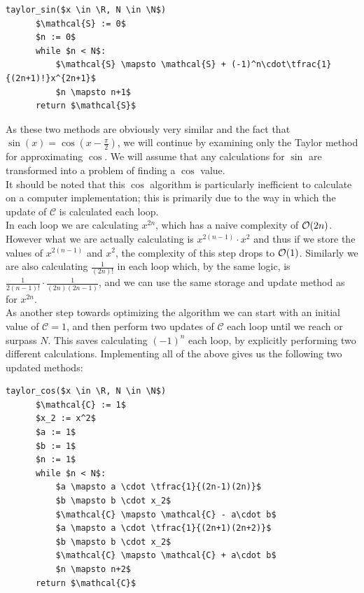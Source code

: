 {\begin{lstlisting}[caption={Taylor computation of \(\cos\) and \(\sin\)},label={PCD_"Taylor Cos/Sin"}]
  taylor_sin($x \in \R, N \in \N$)
      $\mathcal{S} := 0$
      $n := 0$
      while $n < N$:
          $\mathcal{S} \mapsto \mathcal{S} + (-1)^n\cdot\tfrac{1}{(2n+1)!}x^{2n+1}$
          $n \mapsto n+1$
      return $\mathcal{S}$
\end{lstlisting}

As these two methods are obviously very similar and the fact that \(\sin(x) = \cos(x - \frac{\pi}{2})\), we will continue by examining only the Taylor method for approximating \(\cos\). We will assume that any calculations for \(\sin\) are transformed into a problem of finding a \(\cos\) value.\\

It should be noted that this \(\cos\) algorithm is particularly inefficient to calculate on a computer implementation; this is primarily due to the way in which the update of \(\mathcal{C}\) is calculated each loop.\\

In each loop we are calculating \(x^{2n}\), which has a naive complexity of \(\mathcal{O}(2n)\). However what we are actually calculating is \(x^{2(n-1)}\cdot x^2\) and thus if we store the values of \(x^{2(n-1)}\) and \(x^2\), the complexity of this step drops to \(\mathcal{O}(1)\). Similarly we are also calculating \(\tfrac{1}{(2n)!}\) in each loop which, by the same logic, is \(\tfrac{1}{2(n-1)!} \cdot \tfrac{1}{(2n)(2n-1)}\), and we can use the same storage and update method as for \(x^{2n}\).\\

As another step towards optimizing the algorithm we can start with an initial value of \(\mathcal{C} = 1\), and then perform two updates of \(\mathcal{C}\) each loop until we reach or surpass \(N\). This saves calculating \((-1)^n\) each loop, by explicitly performing two different calculations. Implementing all of the above gives us the following two updated methods:

\begin{lstlisting}[caption={Taylor computation of \(\cos\) optimised},label={PCD_"Taylor Cos opt"}]
  taylor_cos($x \in \R, N \in \N$)
      $\mathcal{C} := 1$
      $x_2 := x^2$
      $a := 1$
      $b := 1$
      $n := 1$
      while $n < N$:
          $a \mapsto a \cdot \tfrac{1}{(2n-1)(2n)}$
          $b \mapsto b \cdot x_2$
          $\mathcal{C} \mapsto \mathcal{C} - a\cdot b$
          $a \mapsto a \cdot \tfrac{1}{(2n+1)(2n+2)}$
          $b \mapsto b \cdot x_2$
          $\mathcal{C} \mapsto \mathcal{C} + a\cdot b$
          $n \mapsto n+2$
      return $\mathcal{C}$
\end{lstlisting}

}
